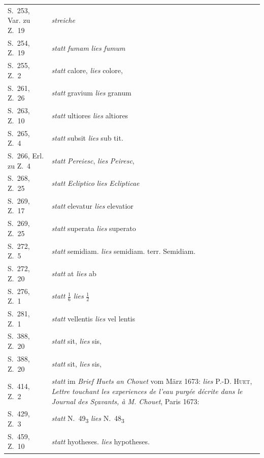 \begin{longtable}{lp{100mm}}
S.~253, Var. zu Z.~19 & \textit{streiche}\\%
S.~254, Z.~19 & \textit{statt} \textit{fumam} \textit{lies} \textit{fumum}\\%
S.~255, Z.~2 & \textit{statt} calore, \textit{lies} colore,\\%
S.~261, Z.~26 & \textit{statt} gravium \textit{lies} granum\\%
S.~263, Z.~10 & \textit{statt} ultiores \textit{lies} altiores\\%
S.~265, Z.~4 & \textit{statt} subsit \textit{lies} sub tit.\\%
S.~266, Erl. zu Z.~4 & \textit{statt} \textit{Pereiesc}, \textit{lies} \textit{Peiresc},\\%
S.~268, Z.~25 & \textit{statt} \textit{Ecliptico} \textit{lies} \textit{Eclipticae}\\%
S.~269, Z.~17 & \textit{statt} elevatur \textit{lies} elevatior\\%
S.~269, Z.~25 & \textit{statt} superata \textit{lies} superato\\%
S.~272, Z.~5 & \textit{statt} semidiam. \textit{lies} semidiam. terr. Semidiam.\\%
S.~272, Z.~20 & \textit{statt} at \textit{lies} ab\\%
S.~276, Z.~1 & \textit{statt} $\displaystyle \frac{1}{6}$ \textit{lies} $\displaystyle \frac{1}{2}$\\%
S.~281, Z.~1 & \textit{statt} vellentis \textit{lies} vel lentis\\%
S.~388, Z.~20 & \textit{statt} sit, \textit{lies} sis,\\%
S.~388, Z.~20 & \textit{statt} sit, \textit{lies} sis,\\%
S.~414, Z.~2 & \textit{statt} im \textit{Brief Huets an Chouet} vom März 1673: \textit{lies} \cite{00163}\textsc{P.-D. Huet}, \textit{Lettre tou\-chant les experiences de l'eau purgée décrite dans le Journal des S\c{c}avants, à M. Chouet}, Paris 1673:\\%
S.~429, Z.~3 & \textit{statt} N.~49\textsubscript{3} \textit{lies} N.~48\textsubscript{3}\\%
S.~459, Z.~10 & \textit{statt} hyotheses. \textit{lies} hypotheses.\\%

\end{longtable}
